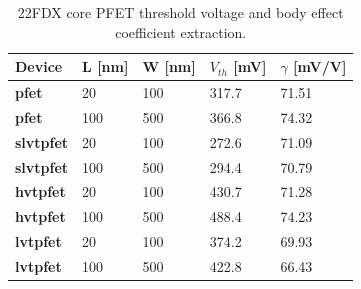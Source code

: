 			\begin{table}[htb!]
				\centering
				\def\arraystretch{1.5}		
				\setlength\arrayrulewidth{1pt}
				\setlength{\tabcolsep}{1em} %
				\fontfamily{\sfdefault}\selectfont 
				\begin{tabular}{|l|l|l|l|l|}	
					\hline 
					\rule[-1ex]{0pt}{2.5ex} \cellcolor{gray!40}\textbf{Device} & \cellcolor{gray!40}\textbf{L [nm]} & \cellcolor{gray!40}\textbf{W [nm]} & \cellcolor{gray!40}\textbf{$V_{th}$ [mV]} & \cellcolor{gray!40}\textbf{$\gamma$ [mV/V]}\\ 
					\hline 
					\rule[-1ex]{0pt}{2.5ex} \textbf{pfet} & 20 & 100 & 317.7 & 71.51 \\ 
					\hline 
					\rule[-1ex]{0pt}{2.5ex} \textbf{pfet} & 100 & 500 & 366.8 & 74.32 \\ 
					\hline 
					\rule[-1ex]{0pt}{2.5ex} \textbf{slvtpfet} & 20 & 100 & 272.6 & 71.09 \\ 
					\hline 
					\rule[-1ex]{0pt}{2.5ex} \textbf{slvtpfet} & 100 & 500 & 294.4 & 70.79 \\ 
					\hline 
					\rule[-1ex]{0pt}{2.5ex} \textbf{hvtpfet} & 20 & 100 & 430.7 & 71.28 \\ 
					\hline 
					\rule[-1ex]{0pt}{2.5ex} \textbf{hvtpfet} & 100 & 500 & 488.4 & 74.23 \\ 
					\hline 
					\rule[-1ex]{0pt}{2.5ex} \textbf{lvtpfet} & 20 & 100 & 374.2 & 69.93 \\ 
					\hline 
					\rule[-1ex]{0pt}{2.5ex} \textbf{lvtpfet} & 100 & 500 & 422.8 & 66.43 \\ 
					\hline 
				\end{tabular} 
				\caption{22FDX core PFET threshold voltage and body effect coefficient extraction.}
				\label{tab:pfet_vth_gamma}
			\end{table} 	
\FloatBarrier

